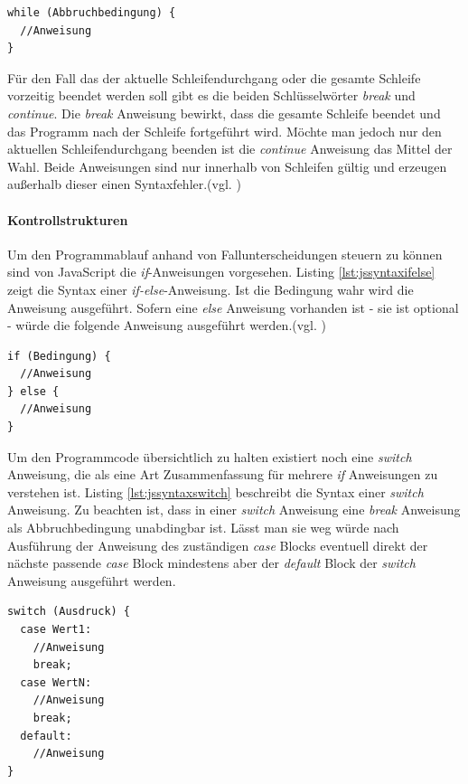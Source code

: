 \documentclass[12pt,a4paper,bibliography=totocnumbered,listof=totocnumbered]{scrartcl}
\begin{document}
	\vspace{1em}
	\begin{lstlisting}[caption=Syntax While-Schleife, label=lst:jssyntaxwhile]
while (Abbruchbedingung) {
  //Anweisung
}
	\end{lstlisting}
	
Für den Fall das der aktuelle Schleifendurchgang oder die gesamte Schleife vorzeitig beendet werden soll gibt es die beiden Schlüsselwörter \textit{break} und \textit{continue}. Die \textit{break} Anweisung bewirkt, dass die gesamte Schleife beendet und das Programm nach der Schleife fortgeführt wird. Möchte man jedoch nur den aktuellen Schleifendurchgang beenden ist die \textit{continue} Anweisung das Mittel der Wahl. Beide Anweisungen sind nur innerhalb von Schleifen gültig und erzeugen außerhalb dieser einen Syntaxfehler.(vgl. \cite[S.103f]{FlanJava2007})

\paragraph{Kontrollstrukturen} Um den Programmablauf anhand von Fallunterscheidungen steuern zu können sind von JavaScript die \textit{if}-Anweisungen vorgesehen. Listing \ref{lst:jssyntaxifelse} zeigt die Syntax einer \textit{if-else}-Anweisung. Ist die Bedingung wahr wird die Anweisung ausgeführt. Sofern eine \textit{else} Anweisung vorhanden ist - sie ist optional - würde die folgende Anweisung ausgeführt werden.(vgl. \cite[S.80]{WenzJava2008})

	\vspace{1em}
	\begin{lstlisting}[caption=Syntax If-else-Anweisung, label=lst:jssyntaxifelse]
if (Bedingung) {
  //Anweisung
} else {
  //Anweisung
}
	\end{lstlisting}
	
Um den Programmcode übersichtlich zu halten existiert noch eine \textit{switch} Anweisung, die als eine Art Zusammenfassung für mehrere \textit{if} Anweisungen zu verstehen ist. Listing \ref{lst:jssyntaxswitch} beschreibt die Syntax einer \textit{switch} Anweisung. Zu beachten ist, dass in einer \textit{switch} Anweisung eine \textit{break} Anweisung als Abbruchbedingung unabdingbar ist. Lässt man sie weg würde nach Ausführung der Anweisung des zuständigen \textit{case} Blocks eventuell direkt der nächste passende \textit{case} Block mindestens aber der \textit{default} Block der \textit{switch} Anweisung ausgeführt werden.

	\vspace{1em}
	\begin{lstlisting}[caption=Syntax Switch-Anweisung, label=lst:jssyntaxswitch]
switch (Ausdruck) {
  case Wert1:
    //Anweisung
    break;
  case WertN:
    //Anweisung
    break;
  default:
    //Anweisung
}
	\end{lstlisting}
\end{document}

